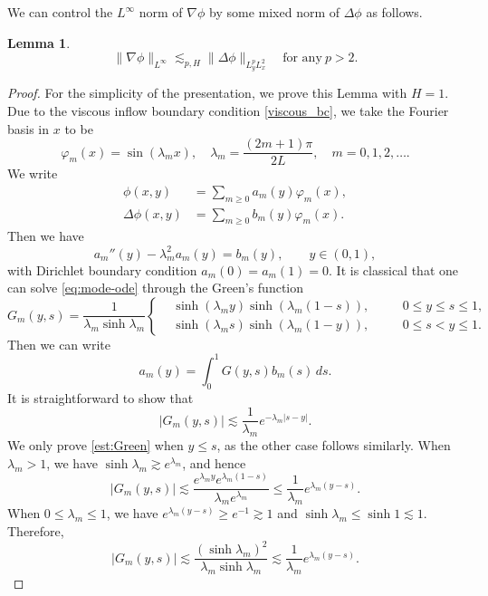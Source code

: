 \documentclass[reqno, 11pt]{amsart}
\theoremstyle{plain}
\newtheorem{lemma}[theorem]{Lemma}
\theoremstyle{definition}
\theoremstyle{remark}
\numberwithin{equation}{section}
\begin{document}
We can control the $L^\infty$ norm of $\nabla \phi$ by some mixed norm of $\Delta \phi$ as follows.

\begin{lemma}
\begin{equation}\label{est:nabla_phi1}
\| \nabla \phi\|_{L^\infty} \lesssim_{p,H} \| \Delta \phi\|_{L^p_yL^2_x}\quad \mbox{for any}~ p > 2.
\end{equation}
\end{lemma}
\begin{proof}
For the simplicity of the presentation, we prove this Lemma with $H = 1$. Due to the viscous inflow boundary condition \eqref{viscous_bc}, we take the Fourier basis in $x$ to be
$$
\varphi_m(x)=\sin(\lambda_m x),\quad \lambda_m=\frac{(2m+1)\pi}{2L},\quad m=0,1,2,\dots.
$$
We write
\begin{align*}
\phi(x,y)&=\sum_{m\ge0} a_m(y)\varphi_m(x),\\
\Delta \phi(x,y)&=\sum_{m\ge0} b_m(y)\varphi_m(x).
\end{align*}
Then we have
\begin{equation}\label{eq:mode-ode}
a_m''(y)-\lambda_m^2 a_m(y)=b_m(y),\qquad y\in(0,1),
\end{equation}
with Dirichlet boundary condition \(a_m(0)=a_m(1)=0\). It is classical that one can solve \eqref{eq:mode-ode} through the Green's function
$$
G_m(y,s) = \frac{1}{\lambda_m \sinh \lambda_m} \left\{
\begin{aligned}
&\sinh(\lambda_m y) \sinh (\lambda_m (1-s)), \quad && 0 \le y \le s \le 1,\\
&\sinh(\lambda_m s) \sinh (\lambda_m (1-y)), \quad && 0 \le s < y \le 1.
\end{aligned}
\right.
$$
Then we can write
$$
a_m(y) = \int_0^1 G(y,s) b_m(s) \, ds.
$$
It is straightforward to show that
\begin{equation}\label{est:Green}
|G_m(y,s)| \lesssim \frac{1}{\lambda_m}e^{- \lambda_m |s-y|}.
\end{equation}
We only prove \eqref{est:Green} when $y \le s$, as the other case follows similarly. When $\lambda_m > 1$, we have $\sinh \lambda_m \gtrsim e^{\lambda_m}$, and hence
$$
|G_m(y,s)| \lesssim \frac{e^{\lambda_m y}e^{\lambda_m (1-s)}}{\lambda_m e^{\lambda_m}} \le \frac{1}{\lambda_m}e^{ \lambda_m (y-s)}.
$$
When $0 \le \lambda_m \le 1$, we have $e^{ \lambda_m (y-s)} \ge e^{-1} \gtrsim 1$ and $\sinh \lambda_m \le \sinh 1 \lesssim 1$. Therefore,
$$
|G_m(y,s)| \lesssim \frac{(\sinh \lambda_m)^2}{\lambda_m \sinh \lambda_m} \lesssim  \frac{1}{\lambda_m}e^{ \lambda_m (y-s)}.
$$
\end{proof}
\end{document}
